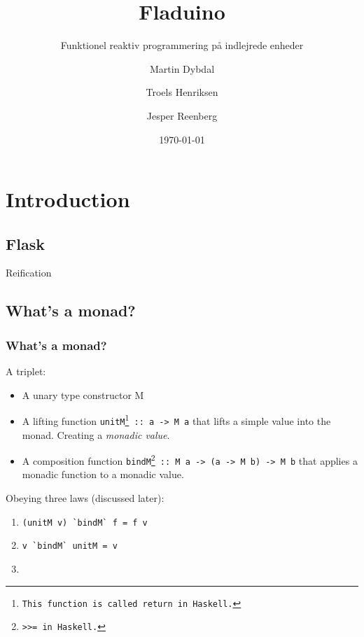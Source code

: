 \documentclass{beamer}
\title{Fladuino}
\subtitle{Funktionel reaktiv programmering på indlejrede enheder}
\author{Martin Dybdal \and Troels Henriksen \and Jesper Reenberg}
\institute{\textrm{Datalogisk Institut, Københavns Universitet}}
\date{\today}
\begin{document}
\frame{\titlepage}


\section{Introduction}
\subsection{Flask}
\begin{frame}


\end{frame}

Reification

\subsection{What's a monad?}
\begin{frame}[fragile]
  \frametitle{What's a monad?}

  A triplet:
  \begin{itemize}
  \item<1-> A unary type constructor M
  \item<1-> A lifting function \texttt{unitM\footnote{This function is called \texttt{return} in
    Haskell.} :: a -> M a} that lifts a simple
    value into the monad. Creating a \textit{monadic
      value}. 
  \item<1-> A composition function \texttt{bindM\footnote{\texttt{>>=} in Haskell.} :: M a -> (a -> M b) -> M b}
     that applies a monadic function to a monadic value. 
  \end{itemize}
\pause
Obeying three laws (discussed later):
  \begin{enumerate}
  \item<2-> \lstinline{(unitM v) `bindM` f = f v}
  \item<2-> \lstinline{v `bindM` unitM = v}
  \item<2-> 
  \end{enumerate}
\end{frame}
\end{document}
